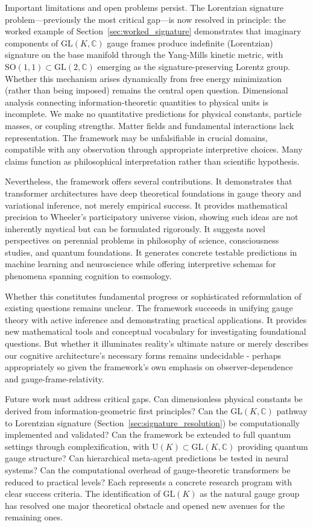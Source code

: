 \documentclass[11pt]{article}
\begin{document}
Important limitations and open problems persist. The Lorentzian signature problem---previously the most critical gap---is now resolved in principle: the worked example of Section~\ref{sec:worked_signature} demonstrates that imaginary components of $\mathrm{GL}(K, \mathbb{C})$ gauge frames produce indefinite (Lorentzian) signature on the base manifold through the Yang-Mills kinetic metric, with $\mathrm{SO}(1,1) \subset \mathrm{GL}(2, \mathbb{C})$ emerging as the signature-preserving Lorentz group. Whether this mechanism arises dynamically from free energy minimization (rather than being imposed) remains the central open question. Dimensional analysis connecting information-theoretic quantities to physical units is incomplete. We make no quantitative predictions for physical constants, particle masses, or coupling strengths. Matter fields and fundamental interactions lack representation. The framework may be unfalsifiable in crucial domains, compatible with any observation through appropriate interpretive choices. Many claims function as philosophical interpretation rather than scientific hypothesis.

Nevertheless, the framework offers several contributions. It demonstrates that transformer architectures have deep theoretical foundations in gauge theory and variational inference, not merely empirical success. It provides mathematical precision to Wheeler's participatory universe vision, showing such ideas are not inherently mystical but can be formulated rigorously. It suggests novel perspectives on perennial problems in philosophy of science, consciousness studies, and quantum foundations. It generates concrete testable predictions in machine learning and neuroscience while offering interpretive schemas for phenomena spanning cognition to cosmology.

Whether this constitutes fundamental progress or sophisticated reformulation of existing questions remains unclear. The framework succeeds in unifying gauge theory with active inference and demonstrating practical applications. It provides new mathematical tools and conceptual vocabulary for investigating foundational questions. But whether it illuminates reality's ultimate nature or merely describes our cognitive architecture's necessary forms remains undecidable - perhaps appropriately so given the framework's own emphasis on observer-dependence and gauge-frame-relativity.

Future work must address critical gaps. Can dimensionless physical constants be derived from information-geometric first principles? Can the $\mathrm{GL}(K, \mathbb{C})$ pathway to Lorentzian signature (Section~\ref{sec:signature_resolution}) be computationally implemented and validated? Can the framework be extended to full quantum settings through complexification, with $\mathrm{U}(K) \subset \mathrm{GL}(K, \mathbb{C})$ providing quantum gauge structure? Can hierarchical meta-agent predictions be tested in neural systems? Can the computational overhead of gauge-theoretic transformers be reduced to practical levels? Each represents a concrete research program with clear success criteria. The identification of $\mathrm{GL}(K)$ as the natural gauge group~\cite{Dennis2026GL} has resolved one major theoretical obstacle and opened new avenues for the remaining ones.
\end{document}
